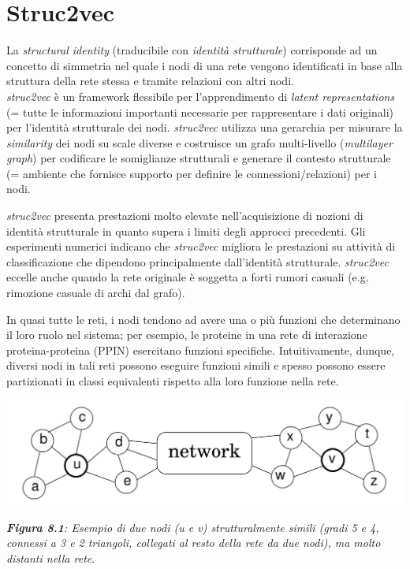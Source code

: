 \documentclass[11pt]{article}
\begin{document}
\pagebreak
\section{Struc2vec}
La \textit{structural identity} (traducibile con \textit{identità strutturale}) corrisponde ad un concetto di simmetria nel quale i nodi di una rete vengono identificati in base alla struttura della rete stessa e tramite relazioni con altri nodi. \\

\textit{struc2vec} è un framework flessibile per l'apprendimento di \textit{latent representations} (= tutte le informazioni importanti necessarie per rappresentare i dati originali) per l'identità strutturale dei nodi.
\textit{struc2vec} utilizza una gerarchia per misurare la \textit{similarity} dei nodi su scale diverse e costruisce un grafo multi-livello (\textit{multilayer graph}) per codificare le somiglianze strutturali e generare il contesto strutturale (= ambiente che fornisce supporto per definire le connessioni/relazioni) per i nodi.

\textit{struc2vec} presenta prestazioni molto elevate nell'acquisizione di nozioni di identità strutturale in quanto supera i limiti degli approcci precedenti. Gli esperimenti numerici indicano che \textit{struc2vec} migliora le prestazioni su attività di classificazione che dipendono principalmente dall'identità strutturale.
\textit{struc2vec} eccelle anche quando la rete originale è soggetta a forti rumori casuali (e.g. rimozione casuale di archi dal grafo).

In quasi tutte le reti, i nodi tendono ad avere una o più funzioni che determinano il loro ruolo nel sistema; per esempio, le proteine in una rete di interazione proteina-proteina (PPIN) esercitano funzioni specifiche. 
Intuitivamente, dunque, diversi nodi in tali reti possono eseguire funzioni simili e spesso possono essere partizionati in classi equivalenti rispetto alla loro funzione nella rete.

\begin{center}
\includegraphics[scale=0.36]{struc1}

\begin{small}\textit{\textbf{Figura 8.1}: Esempio di due nodi (u e v) strutturalmente simili (gradi 5 e 4, connessi a 3 e 2 triangoli, collegati al resto della rete da due nodi), ma molto distanti nella rete}.\end{small}
\end{center}
\end{document}
